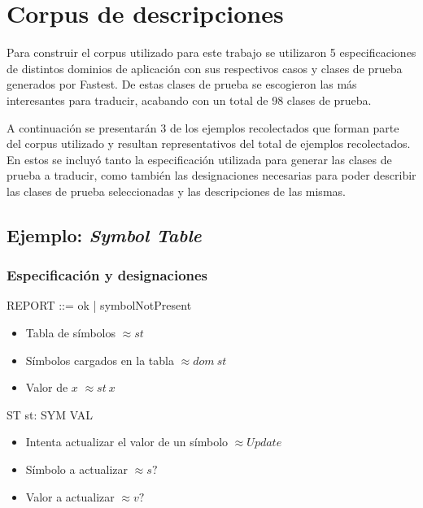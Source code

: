 \chapter{Corpus de descripciones}
\label{ape:corpus}

Para construir el corpus utilizado para este trabajo se utilizaron 5 especificaciones de distintos dominios de aplicación con sus respectivos casos y clases de prueba generados por Fastest. De estas clases de prueba se escogieron las más interesantes para traducir, acabando con un total de 98 clases de prueba.

A continuación se presentarán 3 de los ejemplos recolectados que forman parte del corpus utilizado y resultan representativos del total de ejemplos recolectados. En estos se incluyó tanto la especificación utilizada para generar las clases de prueba a traducir, como también las designaciones necesarias para poder describir las clases de prueba seleccionadas y las descripciones de las mismas.

\section*{Ejemplo: \textit{Symbol Table}}

\subsection*{Especificación y designaciones}

\begin{zed}
 \also
REPORT ::= ok | symbolNotPresent
\end{zed}

\begin{itemize}
  \item Tabla de símbolos $\approx st$ \\
  \item Símbolos cargados en la tabla $\approx dom~st$ \\
  \item Valor de $x$ $\approx st~x$ 
\end{itemize}

\begin{schema}{ST}
st: SYM \pfun VAL
\end{schema}

\begin{itemize}
  \item Intenta actualizar el valor de un símbolo $\approx Update$ \\
  \item Símbolo a actualizar $\approx s?$ \\
  \item Valor a actualizar  $\approx v?$ 
\end{itemize}

